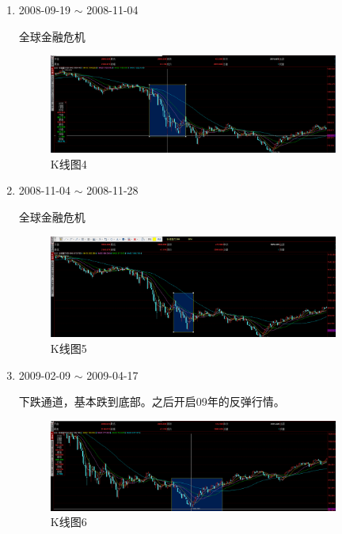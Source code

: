 \documentclass[12pt,a4paper]{article}
\begin{document}
\begin{enumerate}
		\item 2008-09-19 $\sim$ 2008-11-04
		
		全球金融危机
		
		\begin{figure}[H]
			\centering
			\includegraphics[width=0.9\textwidth]{img/54.png}%
			\caption{K线图4}
		\end{figure}
		
		
		\item 2008-11-04 $\sim$ 2008-11-28

		全球金融危机
		
		\begin{figure}[H]
			\centering
			\includegraphics[width=0.9\textwidth]{img/55.png}%
			\caption{K线图5}
		\end{figure}
		
		
		\item 2009-02-09 $\sim$ 2009-04-17
		
		下跌通道，基本跌到底部。之后开启09年的反弹行情。
		
		\begin{figure}[H]
			\centering
			\includegraphics[width=0.9\textwidth]{img/56.png}%
			\caption{K线图6}
		\end{figure}
	
	\end{enumerate}
\end{document}
